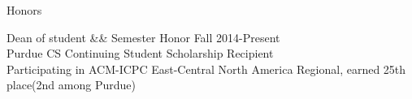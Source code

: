 \documentclass{resume} %
\begin{document}
\begin{rSection}{Honors}{}{}


Dean of student \&\& Semester Honor  \hspace{90mm} Fall  2014-Present\\ 
Purdue CS Continuing Student Scholarship Recipient \\
Participating in ACM-ICPC East-Central North America Regional, earned 25th place(2nd among Purdue) 



\end{rSection}

\end{document}
